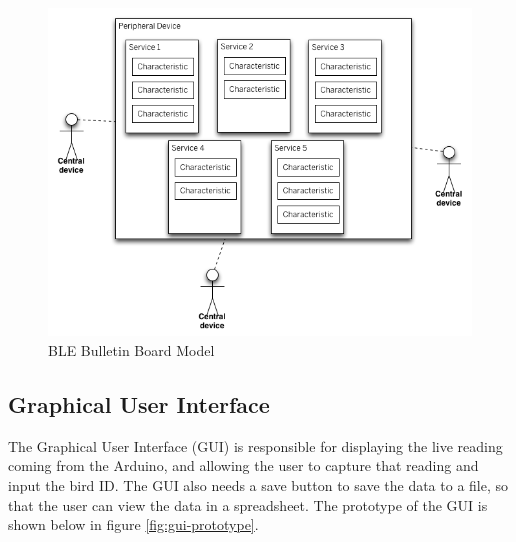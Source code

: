 \documentclass[class=report,11pt,crop=false]{standalone}
\begin{document}
		\begin{figure}[h!]
			\centering
			\includegraphics[scale=0.7]{Figures/ble-bulletin-board-model}
			\caption{BLE Bulletin Board Model \cite{ble}}
			\label{fig:ble-bulletin-board-model}
		\end{figure}
		
		
		\subsection{Graphical User Interface}
		The Graphical User Interface (GUI) is responsible for displaying the live reading coming from the Arduino, and allowing the user to capture that reading and input the bird ID. The GUI also needs a save button to save the data to a file, so that the user can view the data in a spreadsheet.
		The prototype of the GUI is shown below in figure \ref{fig:gui-prototype}.
				
\end{document}
